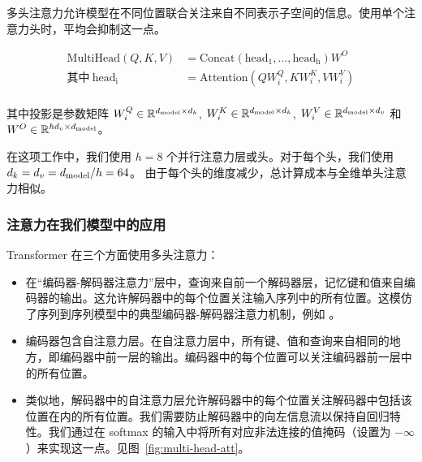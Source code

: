 多头注意力允许模型在不同位置联合关注来自不同表示子空间的信息。使用单个注意力头时，平均会抑制这一点。

\begin{align*}
    \mathrm{MultiHead}(Q, K, V) &= \mathrm{Concat}(\mathrm{head_1}, ..., \mathrm{head_h})W^O\\
    \text{其中}~\mathrm{head_i} &= \mathrm{Attention}(QW^Q_i, KW^K_i, VW^V_i)\\
\end{align*}

其中投影是参数矩阵 $W^Q_i \in \mathbb{R}^{d_{\text{model}} \times d_k}$, $W^K_i \in \mathbb{R}^{d_{\text{model}} \times d_k}$, $W^V_i \in \mathbb{R}^{d_{\text{model}} \times d_v}$ 和 $W^O \in \mathbb{R}^{hd_v \times d_{\text{model}}}$。


在这项工作中，我们使用 $h=8$ 个并行注意力层或头。对于每个头，我们使用 $d_k=d_v=d_{\text{model}}/h=64$。
由于每个头的维度减少，总计算成本与全维单头注意力相似。

\subsubsection{注意力在我们模型中的应用}

Transformer 在三个方面使用多头注意力：
\begin{itemize}
 \item 在“编码器-解码器注意力”层中，查询来自前一个解码器层，记忆键和值来自编码器的输出。这允许解码器中的每个位置关注输入序列中的所有位置。这模仿了序列到序列模型中的典型编码器-解码器注意力机制，例如 \citep{wu2016google, bahdanau2014neural,JonasFaceNet2017}。

 \item 编码器包含自注意力层。在自注意力层中，所有键、值和查询来自相同的地方，即编码器中前一层的输出。编码器中的每个位置可以关注编码器前一层中的所有位置。

 \item 类似地，解码器中的自注意力层允许解码器中的每个位置关注解码器中包括该位置在内的所有位置。我们需要防止解码器中的向左信息流以保持自回归特性。我们通过在 softmax 的输入中将所有对应非法连接的值掩码（设置为 $-\infty$）来实现这一点。见图~\ref{fig:multi-head-att}。

\end{itemize}

